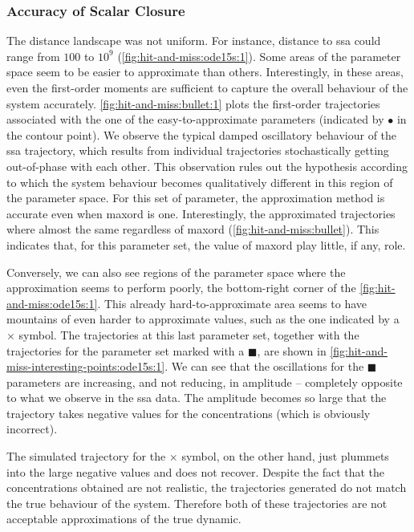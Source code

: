 \subsubsection{Accuracy of Scalar Closure}
The distance landscape was not uniform. For instance, distance to \gls{ssa} could range from $100$ to $10^9$ (\autoref{fig:hit-and-miss:ode15s:1}).
Some areas of the parameter space seem to be easier to approximate than others.
Interestingly, in these areas, even the first-order moments are sufficient to capture the overall behaviour of the system accurately.
\autoref{fig:hit-and-miss:bullet:1} plots the first-order trajectories associated with the one of the easy-to-approximate parameters (indicated by $\bullet$ in the contour point).
We observe the typical damped oscillatory behaviour of the \gls{ssa} trajectory,
which results from individual trajectories stochastically getting out-of-phase with each other\cite{ale_general_2013}.
This observation rules out the hypothesis according to which the system behaviour becomes qualitatively different in this region of the parameter space. 
For this set of parameter, the approximation method is accurate even when \gls{maxord} is one.  
Interestingly, the approximated trajectories where almost the same regardless of \gls{maxord} (\autoref{fig:hit-and-miss:bullet}).
This indicates that, for this parameter set, the value of \gls{maxord} play little, if any, role.

Conversely, we can also see regions of the parameter space where the approximation seems to perform poorly,
\ie{} the bottom-right corner of the \autoref{fig:hit-and-miss:ode15s:1}.
This already hard-to-approximate area seems to have mountains of even harder to approximate values, such as the one indicated by a $\times$ symbol.
The trajectories at this last parameter set, together with the trajectories for the parameter set marked with a $\blacksquare$, are shown in \autoref{fig:hit-and-miss-interesting-points:ode15s:1}.
We can see that the oscillations for the $\blacksquare$ parameters are increasing, and not reducing, in amplitude -- completely opposite to what we observe in the \gls{ssa} data.
The amplitude becomes so large that the trajectory takes negative values for the concentrations (which is obviously incorrect).
 
The simulated trajectory for the $\times$ symbol, on the other hand, just plummets into the large negative values and does not recover.
Despite the fact that the concentrations obtained are not realistic, the trajectories generated do not match the true behaviour of the system.
Therefore both of these trajectories are not acceptable approximations of the true dynamic.


